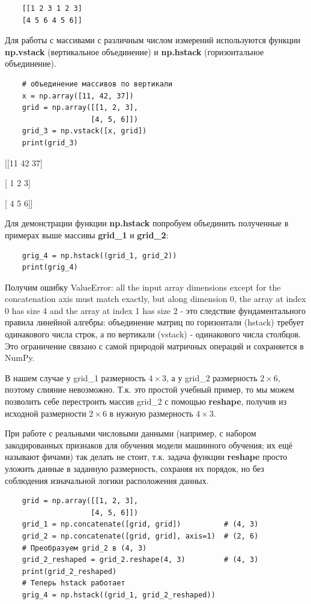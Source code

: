 \documentclass[pract]{SCWorks}
\begin{document}
\begin{itemize}
\begin{verbatim}
    [[1 2 3 1 2 3]
    [4 5 6 4 5 6]]
    \end{verbatim}

    Для работы с массивами с различным числом измерений используются функции \textbf{np.vstack} 
    (вертикальное объединение) и \textbf{np.hstack} (горизонтальное объединение).

    \begin{verbatim}
    # объединение массивов по вертикали
    x = np.array([11, 42, 37])
    grid = np.array([[1, 2, 3],
                    [4, 5, 6]])
    grid_3 = np.vstack([x, grid])
    print(grid_3)
    \end{verbatim}

    [[11 42 37]
    
    [ 1  2  3]
    
    [ 4  5  6]]

    Для демонстрации функции \textbf{np.hstack} попробуем объединить полученные в примерах выше массивы \textbf{grid\_1} 
    и \textbf{grid\_2}:

    \begin{verbatim}
    grig_4 = np.hstack((grid_1, grid_2))
    print(grig_4)
    \end{verbatim}
    Получим ошибку ValueError: all the input array dimensions except for the concatenation axis must match exactly, 
    but along dimension 0, the array at index 0 has size 4 and the array at index 1 has size 2 - 
    это следствие фундаментального правила линейной алгебры: объединение матриц по горизонтали (hstack) требует одинакового 
    числа строк, а по вертикали (vstack) - одинакового числа столбцов. Это ограничение связано с самой природой матричных операций и 
    сохраняется в NumPy.

    В нашем случае у grid\_1 размерность $4 \times 3$, а у grid\_2 размерность $2 \times 6$, поэтому слияние невозможно.
    Т.к. это простой учебный пример, то мы можем позволить себе перестроить массив grid\_2 с помощью \textbf{reshape}, 
    получив из исходной размерности $2 \times 6$ в нужную размерность $4 \times 3$.
    
    При работе с реальными числовыми данными (например, с набором закодированных признаков для обучения 
    модели машинного обучения; их ещё называют фичами) так делать не стоит, т.к. задача функции \textbf{reshape} просто 
    уложить данные в заданную размерность, сохраняя их порядок, но без соблюдения изначальной логики расположения данных.

    \begin{verbatim}
    grid = np.array([[1, 2, 3],
                    [4, 5, 6]])
    grid_1 = np.concatenate([grid, grid])          # (4, 3)
    grid_2 = np.concatenate([grid, grid], axis=1)  # (2, 6)
    # Преобразуем grid_2 в (4, 3)
    grid_2_reshaped = grid_2.reshape(4, 3)         # (4, 3)
    print(grid_2_reshaped)
    # Теперь hstack работает
    grig_4 = np.hstack((grid_1, grid_2_reshaped))


\end{verbatim}
\end{itemize}
\end{document}
